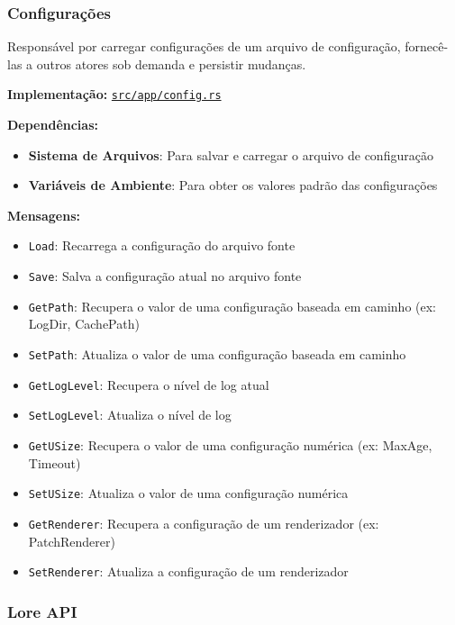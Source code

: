 \subsubsection{Configurações}

Responsável por carregar configurações de um arquivo de configuração, fornecê-las a outros atores sob demanda e persistir mudanças.

\textbf{Implementação:} \href{https://github.com/nahharris/ph-actors-tcc/blob/master/src/app/config.rs}{\texttt{src/app/config.rs}}

\textbf{Dependências:}

\begin{itemize}
    \item \textbf{Sistema de Arquivos}: Para salvar e carregar o arquivo de configuração
    \item \textbf{Variáveis de Ambiente}: Para obter os valores padrão das configurações
\end{itemize}

\textbf{Mensagens:}

\begin{itemize}
    \item \texttt{Load}: Recarrega a configuração do arquivo fonte
    \item \texttt{Save}: Salva a configuração atual no arquivo fonte
    \item \texttt{GetPath}: Recupera o valor de uma configuração baseada em caminho (ex: LogDir, CachePath)
    \item \texttt{SetPath}: Atualiza o valor de uma configuração baseada em caminho
    \item \texttt{GetLogLevel}: Recupera o nível de log atual
    \item \texttt{SetLogLevel}: Atualiza o nível de log
    \item \texttt{GetUSize}: Recupera o valor de uma configuração numérica (ex: MaxAge, Timeout)
    \item \texttt{SetUSize}: Atualiza o valor de uma configuração numérica
    \item \texttt{GetRenderer}: Recupera a configuração de um renderizador (ex: PatchRenderer)
    \item \texttt{SetRenderer}: Atualiza a configuração de um renderizador
\end{itemize}

\subsubsection{Lore API}

